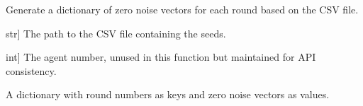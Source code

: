 \documentclass[letterpaper,10pt,english]{sphinxmanual}
\begin{document}

\begin{fulllineitems}
\label{\detokenize{utils_smpc:utils_smpc.calc_noise_zero}}
\pysigstartsignatures
{}
\pysigstopsignatures
\sphinxAtStartPar
Generate a dictionary of zero noise vectors for each round based on the CSV file.
\begin{description}
\begin{description}
\sphinxlineitem{file\_path}{[}str{]}
\sphinxAtStartPar
The path to the CSV file containing the seeds.

\sphinxlineitem{agent\_number}{[}int{]}
\sphinxAtStartPar
The agent number, unused in this function but maintained for API consistency.

\end{description}

\begin{description}
\sphinxAtStartPar
A dictionary with round numbers as keys and zero noise vectors as values.

\end{description}

\begin{sphinxVerbatim}[commandchars=\\\{\}]
   
\PYG{p}{[}\PYG{p}{]}  
\end{sphinxVerbatim}

\end{description}

\end{fulllineitems}
\end{document}

